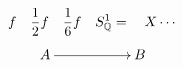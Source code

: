 \documentclass[a4paper,12pt,footinclude=true,headinclude=true,oneside,dottedtoc]{scrbook}
\begin{document}

\[ f \quad \frac{1}{2}f \quad \frac{1}{6}f \quad S^1_{\mathbb{Q}} = \quad X \cdots \]
\[ \xymatrix{ A \ar[rr] & & B } \]
\end{document}
